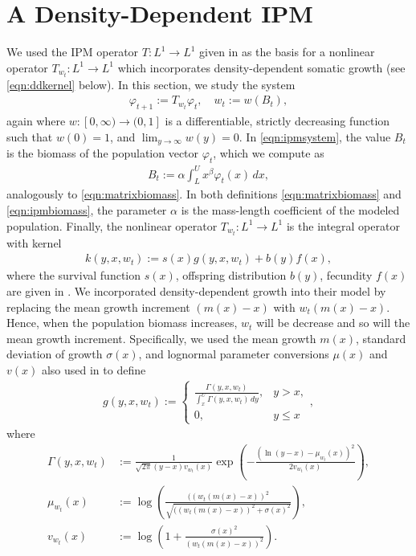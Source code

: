 \section{A Density-Dependent IPM} \label{section:ddipm}

We used the IPM operator $T:L^1 \to L^1$ given in \cite{Vindenes2014} as the basis for a nonlinear operator $T_{w_t}:L^1 \to L^1$ which incorporates density-dependent somatic growth (see \eqref{eqn:ddkernel} below). In this section, we study the system
\begin{align}
	\varphi_{t+1} := T_{w_t} \varphi_t, \quad w_t:=w(B_t), \label{eqn:ipmsystem}
\end{align}
again where $w:[0,\infty) \to (0,1]$ is a differentiable, strictly decreasing function such that $w(0) = 1$, and $\lim_{y \to \infty} w(y) = 0$. In \eqref{eqn:ipmsystem}, the value $B_t$ is the biomass of the population vector $\varphi_t$, which we compute as
\begin{align}
	B_t:= \alpha \int_L^U x^\beta \varphi_t(x) \, dx, \label{eqn:ipmbiomass}
\end{align}
analogously to \eqref{eqn:matrixbiomass}. In both definitions \eqref{eqn:matrixbiomass} and \eqref{eqn:ipmbiomass}, the parameter $\alpha$ is the mass-length coefficient of the modeled population. Finally, the nonlinear operator $T_{w_t}:L^1 \to L^1$ is the integral operator with kernel
\begin{align}
	k(y, x, w_t) := s(x)g(y, x, w_t) + b(y)f(x), \label{eqn:ddkernel}
\end{align}
where the survival function $s(x)$, offspring distribution $b(y)$, fecundity $f(x)$ are given in \cite{Vindenes2014}.  We incorporated density-dependent growth into their model by replacing the mean growth increment $(m(x) - x)$ with $w_t(m(x) - x)$. Hence, when the population biomass increases, $w_t$ will be decrease and so will the mean growth increment. Specifically, we used the mean growth $m(x)$, standard deviation of growth $\sigma(x)$, and lognormal parameter conversions $\mu(x)$ and $v(x)$ also used in \cite{Vindenes2014} to define
\begin{align}
	g(y, x, w_t) := \left\{ \begin{array}{lc} \frac{\Gamma(y, x, w_t)}{\int_x^U \Gamma(y, x, w_t) \, dy}, & y > x, \\ 0, & y \leq x \end{array} \right. ,
\end{align}
where
\begin{align}
	\Gamma(y, x, w_t) &:= \frac{1}{\sqrt{2 \pi}(y - x) v_{w_t}(x)} \exp \left( - \frac{(\ln(y - x) - \mu_{w_t}(x))^2}{2 v_{w_t}(x)} \right), \label{eqn:gammadef}\\
	\mu_{w_t}(x) &:= \log \left( \frac{((w_t(m(x)-x))^2}{\sqrt{((w_t(m(x) - x))^2 + \sigma(x)^2}}\right), \label{eqn:mudef}\\
	v_{w_t}(x) &:= \log \left( 1 + \frac{\sigma(x)^2}{(w_t(m(x)-x))^2}\right).	\label{eqn:vdef}
\end{align}
